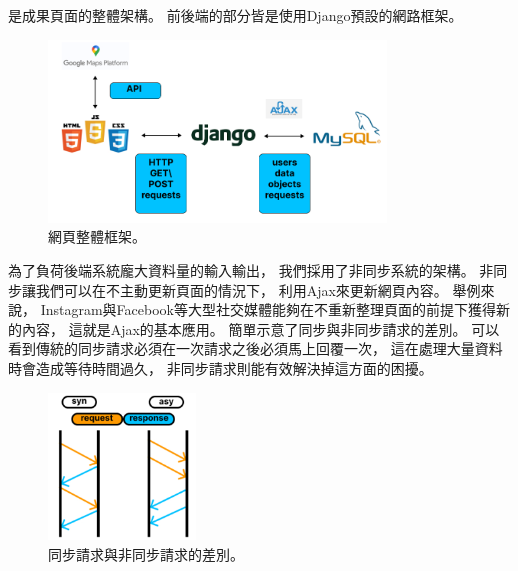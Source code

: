 \documentclass[a4paper,12pt]{extarticle}
\begin{document}
            是成果頁面的整體架構。
            前後端的部分皆是使用Django預設的網路框架。
            \begin{figure}[htb]
                \centering
                \includegraphics[width=0.8\textwidth]{webpage.png}
                \caption{
                    網頁整體框架。
                }
                \label{fig:webpage}
            \end{figure}
            為了負荷後端系統龐大資料量的輸入輸出，
            我們採用了非同步系統的架構。
            非同步讓我們可以在不主動更新頁面的情況下，
            利用Ajax來更新網頁內容。
            舉例來說，
            Instagram與Facebook等大型社交媒體能夠在不重新整理頁面的前提下獲得新的內容，
            這就是Ajax的基本應用。
            簡單示意了同步與非同步請求的差別。
            可以看到傳統的同步請求必須在一次請求之後必須馬上回覆一次，
            這在處理大量資料時會造成等待時間過久，
            非同步請求則能有效解決掉這方面的困擾。
            \begin{figure}[htbp]
                \centering
                \includegraphics[width=0.35\textwidth]{asynchronous.png}
                \caption{
                    同步請求與非同步請求的差別。
                }
                \label{fig:asynchronous}
            \end{figure}
\end{document}
